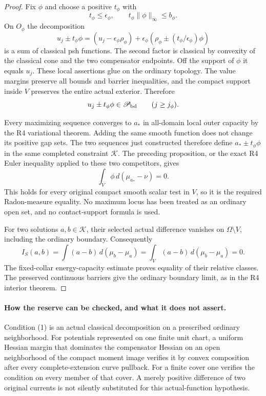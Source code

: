 \documentclass[11pt,a4paper]{article}
\numberwithin{equation}{section}
\theoremstyle{definition}
\theoremstyle{remark}
\begin{document}
\begin{proof}
Fix $\phi$ and choose a positive $t_\phi$ with
\[
 t_\phi\le\epsilon_\phi,
       \qquad t_\phi\|\phi\|_\infty\le b_\phi.
\]
On $O_\phi$ the decomposition
\[
 u_j\pm t_\phi\phi
   =(u_j-\epsilon_\phi\rho_\phi)
      +\epsilon_\phi
            (\rho_\phi\pm(t_\phi/\epsilon_\phi)\phi)
\]
is a sum of classical psh functions. The second factor is classical by
convexity of the classical cone and the two compensator endpoints.
Off the support of $\phi$ it equals $u_j$. These local assertions glue
on the ordinary topology. The value margins preserve all bounds and
barrier inequalities, and the compact support inside $V$ preserves the
entire actual exterior. Therefore
\[
                 u_j\pm t_\phi\phi\in\mathscr P_{\rm bd}
                              \qquad(j\ge j_\phi).
\]

Every maximizing sequence converges to $a_*$ in all-domain local outer
capacity by the R4 variational theorem. Adding the same smooth function
does not change its positive gap sets. The two sequences just constructed
therefore define $a_*\pm t_\phi\phi$ in the same completed constraint
$\mathscr K$. The preceding proposition, or the exact R4 Euler
inequality applied to these two competitors, gives
\[
                     \int_V\phi\,d(\mu_{a_*}-\nu)=0.
\]
This holds for every original compact smooth scalar test in $V$, so it
is the required Radon-measure equality. No maximum locus has been
treated as an ordinary open set, and no contact-support formula is used.

For two solutions $a,b\in\mathscr K$, their selected actual difference
vanishes on $\Omega\setminus V$, including the ordinary boundary.
Consequently
\[
 I_S(a,b)=\int(a-b)\,d(\mu_b-\mu_a)
       =\int_V(a-b)\,d(\mu_b-\mu_a)=0.
\]
The fixed-collar energy-capacity estimate proves equality of their
relative classes. The preserved continuous barriers give the ordinary
boundary limit, as in the R4 interior theorem.
\end{proof}

\paragraph{How the reserve can be checked, and what it does not assert.}
Condition (1) is an actual classical decomposition on a prescribed
ordinary neighborhood. For potentials represented on one finite unit
chart, a uniform Hessian margin that dominates the compensator Hessian
on an open neighborhood of the compact moment image verifies it by
convex composition after every complete-extension curve pullback.
For a finite cover one verifies the condition on every member of that
cover. A merely positive difference of two original currents is not
silently substituted for this actual-function hypothesis.
\end{document}
